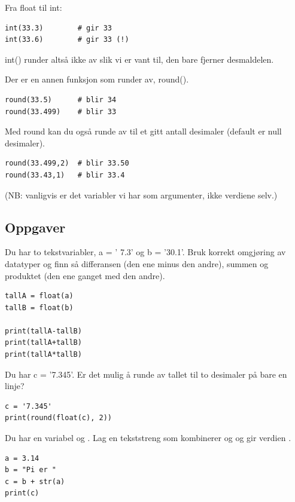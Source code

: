 Fra float til int:
\begin{lstlisting}
int(33.3)        # gir 33
int(33.6)        # gir 33 (!)
\end{lstlisting}

int() runder altså ikke av slik vi er vant til, den bare fjerner desmaldelen. 

Der er en annen funksjon som runder av, round().

\begin{lstlisting}
round(33.5)      # blir 34 
round(33.499)    # blir 33
\end{lstlisting}

Med round kan du også runde av til et gitt antall desimaler (default er null desimaler).
\begin{lstlisting}
round(33.499,2)  # blir 33.50
round(33.43,1)   # blir 33.4
\end{lstlisting}

(NB: vanligvis er det variabler vi har som argumenter, ikke verdiene selv.)  

\subsection{Oppgaver}

\begin{exercise}
Du har to tekstvariabler, a = ' 7.3' og b = '30.1'. Bruk korrekt omgjøring av datatyper og finn så differansen (den ene minus den andre), summen og produktet (den ene ganget med den andre).
\end{exercise}
\begin{solution}
\begin{lstlisting}
tallA = float(a)
tallB = float(b)

print(tallA-tallB)
print(tallA+tallB)
print(tallA*tallB)
\end{lstlisting}
\end{solution}

\begin{exercise}
Du har c = '7.345'. Er det mulig å runde av tallet til to desimaler på bare en linje?
\end{exercise}
\begin{solution}
\begin{lstlisting}
c = '7.345'
print(round(float(c), 2))
\end{lstlisting}
\end{solution}

\begin{exercise}
Du har en variabel  og . Lag en tekststreng  som kombinerer  og  og gir verdien .
\end{exercise}
\begin{solution}
\begin{lstlisting}
a = 3.14
b = "Pi er "
c = b + str(a)
print(c)
\end{lstlisting}
\end{solution}

